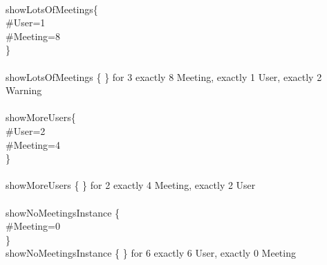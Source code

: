         \qquad \\
         showLotsOfMeetings\{\\
        \qquad \-\qquad \#User=1\\
        \qquad \-\qquad \#Meeting=8\\
        \qquad \}\\
        \qquad \\
         showLotsOfMeetings \{ \} {\color{blue}for} 3  exactly 8 \qquad Meeting, {\color{blue}exactly} 1 \qquad User, {\color{blue}exactly} 2 \qquad Warning\\
        \qquad \\
         showMoreUsers\{\\
        \qquad \-\qquad \#User=2\\
        \qquad \-\qquad \#Meeting=4\\
        \qquad \}\\
        \qquad \\
         showMoreUsers \{ \} {\color{blue}for} 2  exactly 4 \qquad Meeting, {\color{blue}exactly} 2 \qquad User\\
        \qquad \\
         showNoMeetingsInstance \{\\
        \qquad \-\qquad \#Meeting=0\\
        \qquad \}\\
         showNoMeetingsInstance \{ \} {\color{blue}for} 6  exactly 6 \qquad User, {\color{blue}exactly} 0 \qquad Meeting\\